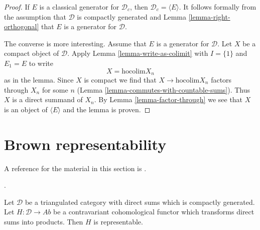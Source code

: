 \begin{proof}
If $E$ is a classical generator for $\mathcal{D}_c$, then
$\mathcal{D}_c = \langle E \rangle$. It follows formally
from the assumption that $\mathcal{D}$ is compactly generated
and Lemma \ref{lemma-right-orthogonal} that $E$ is a generator
for $\mathcal{D}$.

\medskip\noindent
The converse is more interesting. Assume that $E$ is a generator
for $\mathcal{D}$. Let $X$ be a compact object of $\mathcal{D}$.
Apply Lemma \ref{lemma-write-as-colimit} with $I = \{1\}$ and
$E_1 = E$ to write
$$
X = \text{hocolim} X_n
$$
as in the lemma. Since $X$ is compact we
find that $X \to \text{hocolim} X_n$ factors through $X_n$ for
some $n$ (Lemma \ref{lemma-commutes-with-countable-sums}).
Thus $X$ is a direct summand of $X_n$.
By Lemma \ref{lemma-factor-through} we see that $X$ is an
object of $\langle E \rangle$ and the lemma is proven.
\end{proof}











\section{Brown representability}
\label{section-brown}

\noindent
A reference for the material in this section is \cite{Neeman-Grothendieck}.

\begin{lemma}
\label{lemma-brown}
\begin{reference}
\cite[Theorem 3.1]{Neeman-Grothendieck}.
\end{reference}
Let $\mathcal{D}$ be a triangulated category with direct sums which is
compactly generated. Let $H : \mathcal{D} \to \textit{Ab}$ be a contravariant
cohomological functor which transforms direct sums into products.
Then $H$ is representable.
\end{lemma}

